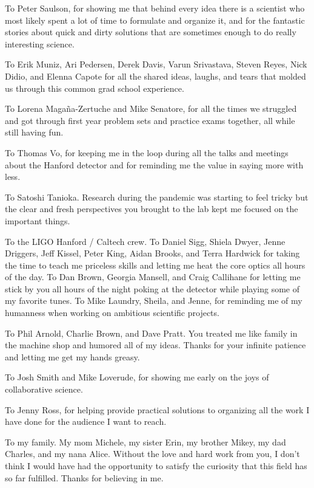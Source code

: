 \documentclass[12pt]{report}
\begin{document}
To Peter Saulson, for showing me that behind every idea there is a scientist who most likely spent a lot of time to formulate and organize it, and for the fantastic stories about quick and dirty solutions that are sometimes enough to do really interesting science.

To Erik Muniz, Ari Pedersen, Derek Davis, Varun Srivastava, Steven Reyes, Nick Didio, and Elenna Capote for all the shared ideas, laughs, and tears that molded us through this common grad school experience. 

To Lorena Magaña-Zertuche and Mike Senatore, for all the times we struggled and got through first year problem sets and practice exams together, all while still having fun. 

To Thomas Vo, for keeping me in the loop during all the talks and meetings about the Hanford detector and for reminding me the value in saying more with less. 

To Satoshi Tanioka. Research during the pandemic was starting to feel tricky but the clear and fresh perspectives you brought to the lab kept me focused on the important things.

To the LIGO Hanford / Caltech crew. To Daniel Sigg, Shiela Dwyer, Jenne Driggers, Jeff Kissel, Peter King, Aidan Brooks, and Terra Hardwick for taking the time to teach me priceless skills and letting me heat the core optics all hours of the day. To Dan Brown, Georgia Mansell, and Craig Callihane for letting me stick by you all hours of the night poking at the detector while playing some of my favorite tunes. To Mike Laundry, Sheila, and Jenne, for reminding me of my humanness when working on ambitious scientific projects.

To Phil Arnold, Charlie Brown, and Dave Pratt. You treated me like family in the machine shop and humored all of my ideas. Thanks for your infinite patience and letting me get my hands greasy.

To Josh Smith and Mike Loverude, for showing me early on the joys of collaborative science.

To Jenny Ross, for helping provide practical solutions to organizing all the work I have done for the audience I want to reach. 

To my family. My mom Michele, my sister Erin, my brother Mikey, my dad Charles, and my nana Alice. Without the love and hard work from you, I don’t think I would have had the opportunity to satisfy the curiosity that this field has so far fulfilled. Thanks for believing in me.
\end{document}
